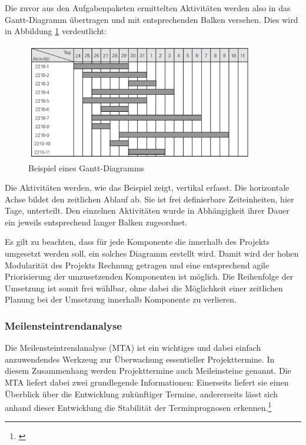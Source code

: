 Die zuvor aus den Aufgabenpaketen ermittelten Aktivitäten werden also in das Gantt-Diagramm übertragen und mit entsprechenden Balken versehen. Dies wird in Abbildung \ref{fig_beispiel_gantt_diagramm} verdeutlicht:

\begin{figure}[h!]
	\centering
	\includegraphics[width=10cm]{kapitel/gruppe4_2/bilder/beispiel_gantt_diagramm}
	\caption{Beispiel eines Gantt-Diagramms}
	\label{fig_beispiel_gantt_diagramm}
\end{figure}

Die Aktivitäten werden, wie das Beispiel zeigt, vertikal erfasst. Die horizontale Achse bildet den zeitlichen Ablauf ab. Sie ist frei definierbare Zeiteinheiten, hier Tage, unterteilt. Den einzelnen Aktivitäten wurde in Abhängigkeit ihrer Dauer ein jeweils entsprechend langer Balken zugeordnet.

Es gilt zu beachten, dass für jede Komponente die innerhalb des Projekts umgesetzt werden soll, ein solches Diagramm erstellt wird. Damit wird der hohen Modularität des Projekts Rechnung getragen und eine entsprechend agile Priorisierung der umzusetzenden Komponenten ist möglich. Die Reihenfolge der Umsetzung ist somit frei wählbar, ohne dabei die Möglichkeit einer zeitlichen Planung bei der Umsetzung innerhalb Komponente zu verlieren.

\subsubsection{Meilensteintrendanalyse}
Die Meilensteintrendanalyse (MTA) ist ein wichtiges und dabei einfach anzuwendendes Werkzeug zur Überwachung essentieller Projekttermine. In diesem Zusammenhang werden Projekttermine auch Meileinsteine genannt. Die MTA liefert dabei zwei grundlegende Informationen: Einerseits liefert sie einen Überblick über die Entwicklung zukünftiger Termine, andererseits lässt sich anhand dieser Entwicklung die Stabilität der Terminprognosen erkennen.\footnote{\cite{gadatsch_masterkurs_2014}}

